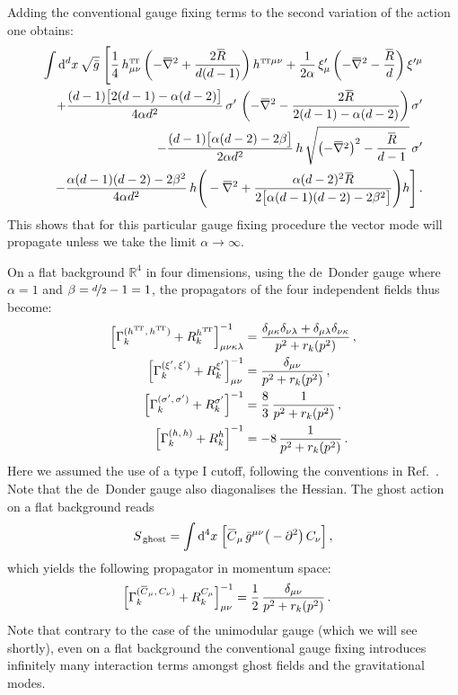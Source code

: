 \documentclass[11pt]{book}
\newcommand{\overbar}[1]{\mkern 1.5mu\overline{\mkern-1.5mu#1\mkern-1.5mu}\mkern 1.5mu}
\newcommand\TTspace{ -1pt }
\newcommand\TT{ \scriptscriptstyle{\mathrm{T\hspace{\TTspace}T}} }
\newcommand\hTTmunu{ h^{\scriptscriptstyle{\mathrm{T\hspace{\TTspace}T}}}_{\mu\nu} }
\newcommand{\bnabla}{\overbar \nabla}
\newcommand{\bR}{\overbar R}
\numberwithin{equation}{chapter}
\begin{document}
\begin{appendices}
Adding the conventional gauge fixing terms to the second variation of the action one obtains:
\begin{align}
  \int \mathrm d^dx \, \sqrt{\bar g} \;
  \Bigg[
    \frac{1}{4} \, \hTTmunu
    \left( -\bnabla^2 + \frac{2\bR}{d(d-1)} \right)
    h^{{\TT} \mu\nu}
    + \frac{1}{2\alpha} \, \xi'_\mu
    \left( -\bnabla^2 - \frac{\bR}{d} \right)
    \xi^{\prime\mu}
    \nonumber \\
    +\frac{(d-1) \big[ 2(d-1)-\alpha(d-2) \big]}{4 \alpha d^2} \,
    \sigma' \,
    \left( -\bnabla^2 - \frac{2\bR}{2(d-1)-\alpha(d-2)} \right)
    \sigma'
    \nonumber \\
    - \frac{(d-1) \big[ \alpha(d-2)-2\beta \big]}{2 \alpha d^2} \,
    h \, \sqrt{\left( -\bnabla^2 \right)^2 - \frac{\bR}{d-1} \, } \, \sigma'
    \nonumber \\
    - \frac{\alpha(d-1)(d-2)-2\beta^2}{4 \alpha d^2} \,
    h
    \Bigg(
      - \bnabla^2 + \frac{\alpha(d-2)^2\bR}{2 \big[ \alpha(d-1)(d-2)-2\beta^2 \big]}
    \Bigg)
    h
  \Bigg] \,.
\end{align}
This shows that for this particular gauge fixing procedure the vector mode will
propagate unless we take the limit $\alpha \rightarrow \infty$.

On a flat background $\mathbb R^4$ in four dimensions,
using the de~Donder gauge where $\alpha = 1$ and $\beta=\nicefrac{d}{2}-1=1$,
the propagators of the four independent fields thus become:
\begin{align}
  \Big[ \Gamma_k^{(h^{\TT},\,h^{\TT})}+R_k^{h^{\TT}} \Big]^{-1}_{\mu \nu \kappa \lambda}
  &= \frac{ \delta_{\mu \kappa} \delta_{\nu \lambda} + \delta_{\mu\lambda} \delta_{\nu\kappa} }{ p^2 + r_k(p^2) } \,, \\
  \Big[ \Gamma_k^{(\xi^\prime,\,\xi^\prime)}+R_k^{\xi^\prime} \Big]^{-1}_{\mu \nu}
  &= \frac{ \delta_{\mu \nu} }{ p^2 + r_k(p^2) } \,, \\
  \Big[ \Gamma_k^{(\sigma^\prime,\,\sigma^\prime)} + R_k^{\sigma^\prime} \Big]^{-1}
  &= \frac{8}{3} \, \frac{1}{ p^2 + r_k(p^2) } \,, \\
  \Big[ \Gamma_k^{(h,\,h)} + R_k^{h} \Big]^{-1}
  &= - 8 \, \frac{1}{ p^2 + r_k(p^2) } \,.
\end{align}
Here we assumed the use of a type I cutoff, following the conventions in Ref.~\cite{Codello:2008vh}.
Note that the de~Donder gauge also diagonalises the Hessian.
The ghost action on a flat background reads
\begin{align}
  S_{\,\mathrm{ghost}}
  = \int \mathrm d^4x \;
  \Big[
    \overbar C_\mu \, \bar g^{\mu\nu}
    \big( - \partial^2 \big) \, C_\nu
  \Big] \,,
\end{align}
which yields the following propagator in momentum space:
\begin{align}
  \Big[ \Gamma_k^{(\overbar C_\mu,\,C_\nu)}+R_k^{C_\mu} \Big]^{-1}_{\mu \nu}
  &= \frac 12 \, \frac{ \delta_{\mu \nu} }{ p^2 + r_k(p^2) } \,.
\end{align}
Note that contrary to the case of the unimodular gauge (which we will
see shortly), even on a flat background the conventional gauge fixing
introduces infinitely many interaction terms amongst ghost fields
and the gravitational modes.


\end{appendices}
\end{document}
